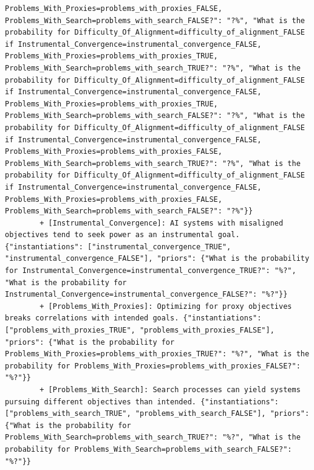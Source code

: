 \documentclass[
  11pt,
  letterpaper,
]{book}
\begin{document}
\begin{verbatim}
Problems_With_Proxies=problems_with_proxies_FALSE, Problems_With_Search=problems_with_search_FALSE?": "?%", "What is the probability for Difficulty_Of_Alignment=difficulty_of_alignment_FALSE if Instrumental_Convergence=instrumental_convergence_FALSE, Problems_With_Proxies=problems_with_proxies_TRUE, Problems_With_Search=problems_with_search_TRUE?": "?%", "What is the probability for Difficulty_Of_Alignment=difficulty_of_alignment_FALSE if Instrumental_Convergence=instrumental_convergence_FALSE, Problems_With_Proxies=problems_with_proxies_TRUE, Problems_With_Search=problems_with_search_FALSE?": "?%", "What is the probability for Difficulty_Of_Alignment=difficulty_of_alignment_FALSE if Instrumental_Convergence=instrumental_convergence_FALSE, Problems_With_Proxies=problems_with_proxies_FALSE, Problems_With_Search=problems_with_search_TRUE?": "?%", "What is the probability for Difficulty_Of_Alignment=difficulty_of_alignment_FALSE if Instrumental_Convergence=instrumental_convergence_FALSE, Problems_With_Proxies=problems_with_proxies_FALSE, Problems_With_Search=problems_with_search_FALSE?": "?%"}}
        + [Instrumental_Convergence]: AI systems with misaligned objectives tend to seek power as an instrumental goal. {"instantiations": ["instrumental_convergence_TRUE", "instrumental_convergence_FALSE"], "priors": {"What is the probability for Instrumental_Convergence=instrumental_convergence_TRUE?": "%?", "What is the probability for Instrumental_Convergence=instrumental_convergence_FALSE?": "%?"}}
        + [Problems_With_Proxies]: Optimizing for proxy objectives breaks correlations with intended goals. {"instantiations": ["problems_with_proxies_TRUE", "problems_with_proxies_FALSE"], "priors": {"What is the probability for Problems_With_Proxies=problems_with_proxies_TRUE?": "%?", "What is the probability for Problems_With_Proxies=problems_with_proxies_FALSE?": "%?"}}
        + [Problems_With_Search]: Search processes can yield systems pursuing different objectives than intended. {"instantiations": ["problems_with_search_TRUE", "problems_with_search_FALSE"], "priors": {"What is the probability for Problems_With_Search=problems_with_search_TRUE?": "%?", "What is the probability for Problems_With_Search=problems_with_search_FALSE?": "%?"}}

\end{verbatim}
\end{document}
